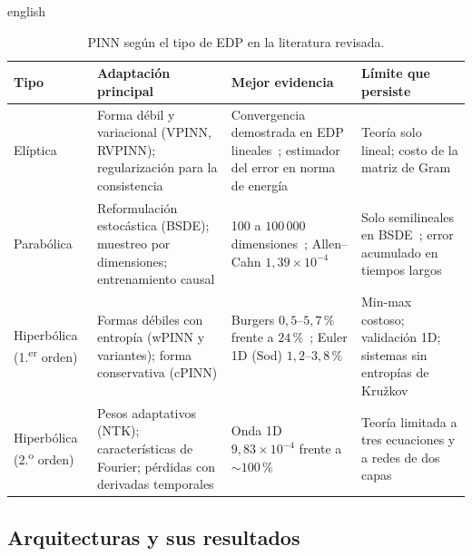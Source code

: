 \documentclass[0000.tex]{subfiles}
\begin{document}
\begin{hyphenrules}{english}
\begin{table}[htbp]
\centering\small
\caption{PINN según el tipo de EDP en la literatura revisada.}
\label{tab:ea-tipos}
\begin{tabularx}{\textwidth}{@{}l Y Y Y@{}}
\toprule
Tipo & Adaptación principal & Mejor evidencia & Límite que persiste \\
\midrule
Elíptica & Forma débil y variacional (VPINN, RVPINN); regularización para la consistencia & Convergencia demostrada en EDP lineales~\cite{shin2020convergence,doumeche2025convergence}; estimador del error en norma de energía~\cite{rojas2024robust} & Teoría solo lineal; costo de la matriz de Gram~\cite{rojas2024robust} \\
Parabólica & Reformulación estocástica (BSDE); muestreo por dimensiones; entrenamiento causal & 100 a $100\,000$ dimensiones~\cite{han2018solving,hu2024tackling}; Allen--Cahn $1{,}39\times10^{-4}$~\cite{wang2022respecting} & Solo semilineales en BSDE~\cite{han2018solving}; error acumulado en tiempos largos~\cite{wang2022respecting} \\
Hiperbólica (1.\textsuperscript{er} orden) & Formas débiles con entropía (wPINN y variantes); forma conservativa (cPINN) & Burgers $0{,}5$--$5{,}7\,\%$ frente a $24\,\%$~\cite{de2024wpinns}; Euler 1D (Sod) $1{,}2$--$3{,}8\,\%$~\cite{chaumet2024improving} & Min-max costoso; validación 1D; sistemas sin entropías de Kružkov~\cite{de2024wpinns,chaumet2024improving} \\
Hiperbólica (2.\textsuperscript{o} orden) & Pesos adaptativos (NTK); características de Fourier; pérdidas con derivadas temporales & Onda 1D $9{,}83\times10^{-4}$ frente a ${\sim}100\,\%$~\cite{wang2021eigenvector} & Teoría limitada a tres ecuaciones y a redes de dos capas~\cite{qian2023error} \\
\bottomrule
\end{tabularx}
\end{table}

\subsection{Arquitecturas y sus resultados}
\label{subsec:ea-arq}


\end{hyphenrules}
\end{document}
